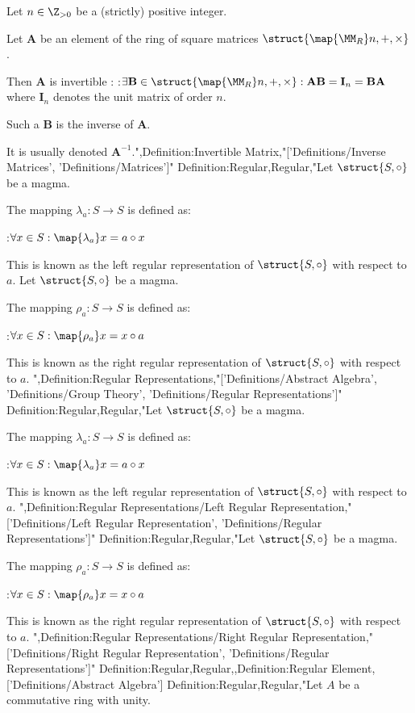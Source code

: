 Let $n \in \Z_{>0}$ be a (strictly) positive integer.

Let $\mathbf A$ be an element of the ring of square matrices $\struct {\map {\MM_R} n, +, \times}$.


Then $\mathbf A$ is invertible :
:$\exists \mathbf B \in \struct {\map {\MM_R} n, +, \times}: \mathbf A \mathbf B = \mathbf I_n = \mathbf B \mathbf A$
where $\mathbf I_n$ denotes the unit matrix of order $n$.


Such a $\mathbf B$ is the inverse of $\mathbf A$.

It is usually denoted $\mathbf A^{-1}$.",Definition:Invertible Matrix,"['Definitions/Inverse Matrices', 'Definitions/Matrices']"
Definition:Regular,Regular,"Let $\struct {S, \circ}$ be a magma.

The mapping $\lambda_a: S \to S$ is defined as:

:$\forall x \in S: \map {\lambda_a} x = a \circ x$


This is known as the left regular representation of $\struct {S, \circ}$ with respect to $a$.
Let $\struct {S, \circ}$ be a magma.

The mapping $\rho_a: S \to S$ is defined as:

:$\forall x \in S: \map {\rho_a} x = x \circ a$


This is known as the right regular representation of $\struct {S, \circ}$ with respect to $a$.
",Definition:Regular Representations,"['Definitions/Abstract Algebra', 'Definitions/Group Theory', 'Definitions/Regular Representations']"
Definition:Regular,Regular,"Let $\struct {S, \circ}$ be a magma.

The mapping $\lambda_a: S \to S$ is defined as:

:$\forall x \in S: \map {\lambda_a} x = a \circ x$


This is known as the left regular representation of $\struct {S, \circ}$ with respect to $a$.
",Definition:Regular Representations/Left Regular Representation,"['Definitions/Left Regular Representation', 'Definitions/Regular Representations']"
Definition:Regular,Regular,"Let $\struct {S, \circ}$ be a magma.

The mapping $\rho_a: S \to S$ is defined as:

:$\forall x \in S: \map {\rho_a} x = x \circ a$


This is known as the right regular representation of $\struct {S, \circ}$ with respect to $a$.
",Definition:Regular Representations/Right Regular Representation,"['Definitions/Right Regular Representation', 'Definitions/Regular Representations']"
Definition:Regular,Regular,,Definition:Regular Element,['Definitions/Abstract Algebra']
Definition:Regular,Regular,"Let $A$ be a commutative ring with unity.

